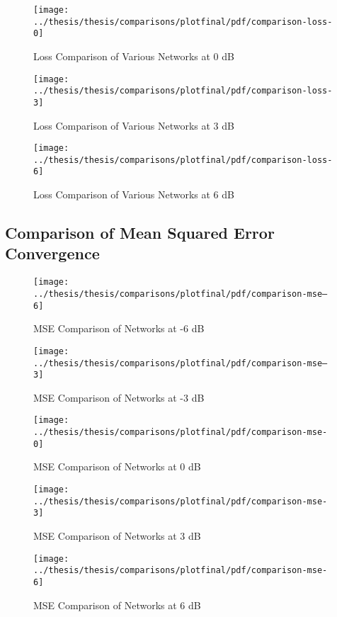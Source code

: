 \begin{figure}[!ht]
\centering
\texttt{[image: ../thesis/thesis/comparisons/plotfinal/pdf/comparison-loss-0]}
\caption{Loss Comparison of Various Networks at 0 dB}
\end{figure}

\begin{figure}[!ht]
\centering
\texttt{[image: ../thesis/thesis/comparisons/plotfinal/pdf/comparison-loss-3]}
\caption{Loss Comparison of Various Networks at 3 dB}
\end{figure}

\begin{figure}[!ht]
\centering
\texttt{[image: ../thesis/thesis/comparisons/plotfinal/pdf/comparison-loss-6]}
\caption{Loss Comparison of Various Networks at 6 dB}
\end{figure}



\subsection{Comparison of Mean Squared Error Convergence}

\begin{figure}[!ht]
\centering
\texttt{[image: ../thesis/thesis/comparisons/plotfinal/pdf/comparison-mse--6]}
\caption{MSE Comparison of Networks at -6 dB}
\end{figure}

\begin{figure}[!ht]
\centering
\texttt{[image: ../thesis/thesis/comparisons/plotfinal/pdf/comparison-mse--3]}
\caption{MSE Comparison of Networks at -3 dB}
\end{figure}

\begin{figure}[!ht]
\centering
\texttt{[image: ../thesis/thesis/comparisons/plotfinal/pdf/comparison-mse-0]}
\caption{MSE Comparison of Networks at 0 dB}
\end{figure}

\begin{figure}[!ht]
\centering
\texttt{[image: ../thesis/thesis/comparisons/plotfinal/pdf/comparison-mse-3]}
\caption{MSE Comparison of Networks at 3 dB}
\end{figure}

\begin{figure}[!ht]
\centering
\texttt{[image: ../thesis/thesis/comparisons/plotfinal/pdf/comparison-mse-6]}
\caption{MSE Comparison of Networks at 6 dB}
\end{figure}


